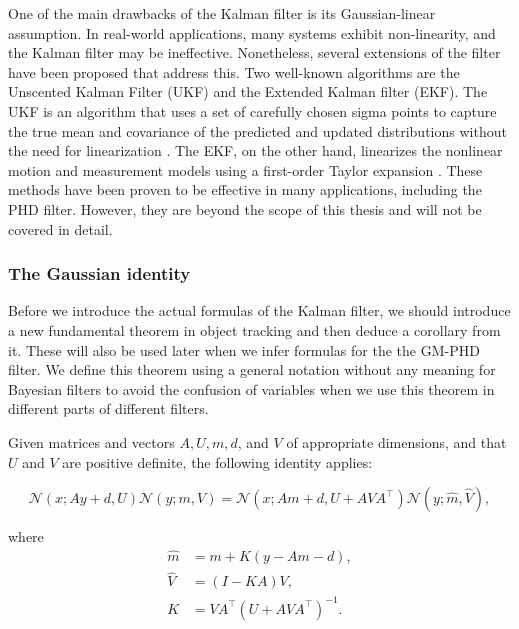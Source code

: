 One of the main drawbacks of the Kalman filter is its Gaussian-linear 
assumption. In real-world applications, many systems exhibit non-linearity, and 
the Kalman filter may be ineffective. Nonetheless, several extensions of the 
filter have been proposed that address this. Two well-known algorithms are the 
Unscented Kalman Filter (UKF) and the Extended Kalman filter (EKF). The UKF is 
an algorithm that uses a set of carefully chosen sigma points to capture the 
true mean and covariance of the predicted and updated distributions without 
the need for linearization \cite{wanUnscentedKalmanFilter2000}. The EKF, on 
the other hand, linearizes the nonlinear motion and measurement models using a 
first-order Taylor expansion \cite{smithApplicationStatisticalFilter1962}. 
These methods have been proven to be effective in many applications, including 
the PHD filter. However, they are beyond the scope of this thesis and will not 
be covered in detail.

\subsubsection{The Gaussian identity}

Before we introduce the actual formulas of the Kalman filter, we should introduce a new fundamental theorem in object tracking and then deduce a corollary from it. These will also be used later when we infer formulas for the the GM-PHD filter. We define this theorem using a general notation without any meaning for Bayesian filters to avoid the confusion of variables when we use this theorem in different parts of different filters.

\begin{theorem}\label{theorem:gaussian-identity}
    Given matrices and vectors $A, U, m, d$, and $V$ of appropriate dimensions, and that $U$ and $V$ are positive definite, the following identity applies:

    \begin{equation}\label{eq:gid}
        \mathscr{N}(x ; A y + d, U) \mathscr{N}(y ; m, V)=\mathscr{N}(x ; A m + d, U + A V A^\intercal) \mathscr{N}(y ; \hat{m}, \hat{V}),
    \end{equation}

    where
    \begin{align}
        \hat{m} & = m + K (y - Am - d), \\ 
        \hat{V} & = (I - K A) V, \\
        K &= V A^\intercal (U + A V A^\intercal)^{-1}.
    \end{align}
\end{theorem}


